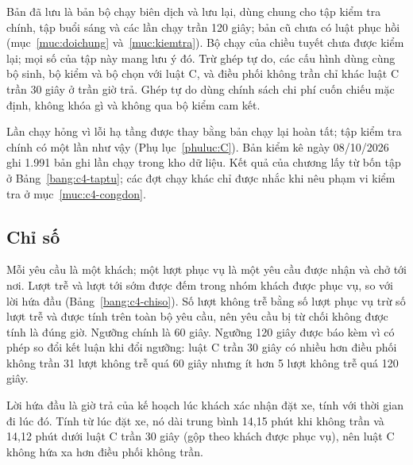 Bản đã lưu là bản bộ chạy biên dịch và lưu lại, dùng chung cho tập kiểm tra chính, tập buổi sáng và các lần chạy
trần 120 giây; bản cũ chưa có luật phục hồi (mục~\ref{muc:doichung} và~\ref{muc:kiemtra}). Bộ chạy của chiều tuyết
chưa được kiểm lại; mọi số của tập này mang lưu ý đó. Trừ ghép tự do, các cấu hình dùng cùng bộ sinh, bộ kiểm và bộ
chọn với luật C, và điều phối không trần chỉ khác luật C trần 30 giây ở trần giờ trả. Ghép tự do dùng chính sách chi
phí cuốn chiếu mặc định, không khóa gì và không qua bộ kiểm cam kết.

Lần chạy hỏng vì lỗi hạ tầng được thay bằng bản chạy lại hoàn tất; tập kiểm tra chính có một lần như vậy
(Phụ lục~\ref{phuluc:C}). Bản kiểm kê ngày 08/10/2026 ghi 1.991 bản ghi lần chạy trong kho dữ liệu. Kết quả của
chương lấy từ bốn tập ở Bảng~\ref{bang:c4-taptu}; các đợt chạy khác chỉ được nhắc khi nêu phạm vi kiểm tra ở
mục~\ref{muc:c4-congdon}.

\subsection{Chỉ số}
\label{muc:c4-chiso}

Mỗi yêu cầu là một khách; một lượt phục vụ là một yêu cầu được nhận và chở tới nơi. Lượt trễ và lượt tới sớm được
đếm trong nhóm khách được phục vụ, so với lời hứa đầu (Bảng~\ref{bang:c4-chiso}). Số lượt không trễ bằng số lượt
phục vụ trừ số lượt trễ và được tính trên toàn bộ yêu cầu, nên yêu cầu bị từ chối không được tính là đúng giờ.
Ngưỡng chính là 60 giây. Ngưỡng 120 giây được báo kèm vì có phép so đổi kết luận khi đổi ngưỡng: luật C trần 30 giây
có nhiều hơn điều phối không trần 31 lượt không trễ quá 60 giây nhưng ít hơn 5 lượt không trễ quá 120 giây.

Lời hứa đầu là giờ trả của kế hoạch lúc khách xác nhận đặt xe, tính với thời gian đi lúc đó. Tính từ lúc đặt xe, nó
dài trung bình 14,15 phút khi không trần và 14,12 phút dưới luật C trần 30 giây (gộp theo khách được phục vụ), nên
luật C không hứa xa hơn điều phối không trần.

